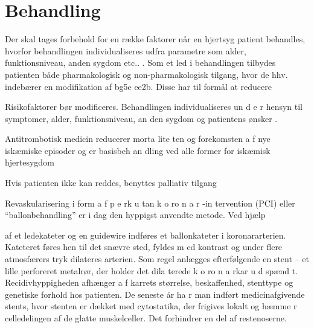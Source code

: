 \section{Behandling}

Der skal tages forbehold for en række faktorer når en hjertsyg patient behandles, hvorfor behandlingen individualiseres udfra parametre som alder, funktionsniveau, anden sygdom etc.. \cite{basis}. Som et led i behandlingen tilbydes patienten både pharmakologisk og non-pharmakologisk tilgang, hvor de hhv. indebærer en modifikation af bg5e
ee2b. Disse har til formål at reducere


Risikofaktorer bør modificeres. Behandlingen
individualiseres un d e r hensyn til symptomer, alder,
funktionsniveau, an den sygdom og patientens ønsker \cite{}.

Antitrombotisk medicin reducerer morta lite ten og
forekomsten a f nye iskæmiske episoder og er basisbeh
an dling ved alle former for iskæmisk hjertesygdom

Hvis patienten ikke kan reddes, benyttes palliativ tilgang

Revaskularisering i form a f p e rk u tan k o ro n a r -in
tervention (PCI) eller “ballonbehandling” er i dag den hyppigst anvendte metode. Ved hjælp

af et ledekateter og en guidewire indføres et ballonkateter
i koronararterien. Kateteret føres hen til det snævre
sted, fyldes m ed kontrast og under flere atmosfærers tryk
dilateres arterien. Som regel anlægges efterfølgende en
stent – et lille perforeret metalrør, der holder det dila
terede k o ro n a rkar u d spænd t. Recidivhyppigheden afhænger
a f karrets størrelse, beskaffenhed, stenttype og
genetiske forhold hos patienten. De seneste år ha r man
indført medicinafgivende stents, hvor stenten er dækket
med cytostatika, der frigives lokalt og hæmme r celledelingen
af de glatte muskelceller. Det forhindrer en del af
restenoserne.
